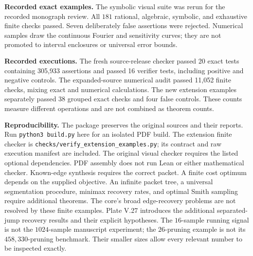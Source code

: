 \textbf{Recorded exact examples.} The symbolic visual suite was rerun for the recorded monograph review. All $181$ rational, algebraic, symbolic, and exhaustive finite checks passed. Seven deliberately false assertions were rejected. Numerical samples draw the continuous Fourier and sensitivity curves; they are not promoted to interval enclosures or universal error bounds.

\textbf{Recorded executions.} The fresh source-release checker passed 20 exact tests containing 305,933 assertions and passed 16 verifier tests, including positive and negative controls. The expanded-source numerical audit passed 11,052 finite checks, mixing exact and numerical calculations. The new extension examples separately passed 38 grouped exact checks and four false controls. These counts measure different operations and are not combined as theorem counts.\par
\textbf{Reproducibility.} The package preserves the original sources and their reports. Run \texttt{python3 build.py} here for an isolated PDF build. The extension finite checker is \texttt{checks/verify\_extension\_examples.py}; its contract and raw execution manifest are included. The original visual checker requires the listed optional dependencies. PDF assembly does not run Lean or either mathematical checker.
Known-edge synthesis requires the correct packet. A finite cost optimum depends on the supplied objective. An infinite packet tree, a universal segmentation procedure, minimax recovery rates, and optimal Smith sampling require additional theorems. The core's broad edge-recovery problems are not resolved by these finite examples. Plate V.27 introduces the additional separated-jump recovery results and their explicit hypotheses.
The $16$-sample running signal is not the $1024$-sample manuscript experiment; the $26$-pruning example is not its $458{,}330$-pruning benchmark. Their smaller sizes allow every relevant number to be inspected exactly.


